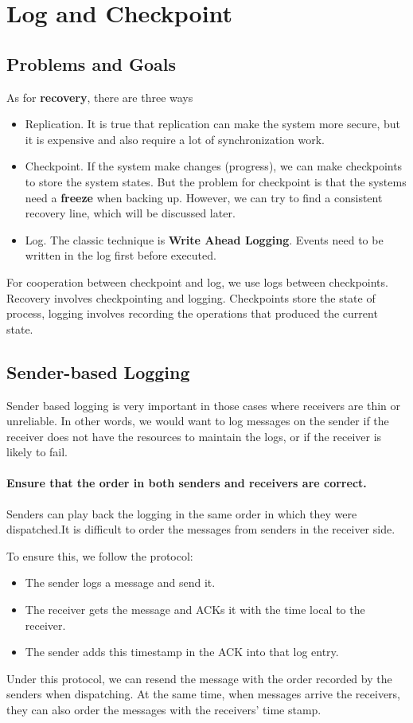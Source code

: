 \chapter{Log and Checkpoint}

\section{Problems and Goals}
As for \textbf{recovery}, there are three ways
\begin{itemize}
    \item Replication. It is true that replication can make the system more secure, but it is expensive and also require a lot of synchronization work.
    \item Checkpoint. If the system make changes (progress), we can make checkpoints to store the system states. But the problem for checkpoint is that the systems need a \textbf{freeze} when backing up. However, we can try to find a consistent recovery line, which will be discussed later.
    \item Log. The classic technique is \textbf{Write Ahead Logging}. Events need to be written in the log first before executed.
\end{itemize}

For cooperation between checkpoint and log, we use logs between checkpoints. Recovery involves checkpointing and logging. Checkpoints store the state of process, logging involves recording the operations that produced the current state.

\section{Sender-based Logging}
Sender based logging is very important in those cases where receivers are thin or unreliable. In other words, we would want to log messages on the sender if the receiver does not have the resources to maintain the logs, or if the receiver is likely to fail. 

\subsubsection{Ensure that the order in both senders and receivers are correct.}

Senders can play back the logging in the same order in which they were dispatched.It is difficult to order the messages from senders in the receiver side.

To ensure this, we follow the protocol:
\begin{itemize}
    \item The sender logs a message and send it.
    \item The receiver gets the message and ACKs it with the time local to the receiver.
    \item The sender adds this timestamp in the ACK into that log entry.
\end{itemize}
Under this protocol, we can resend the message with the order recorded by the senders when dispatching. At the same time, when messages arrive the receivers, they can also order the messages with the receivers' time stamp.


